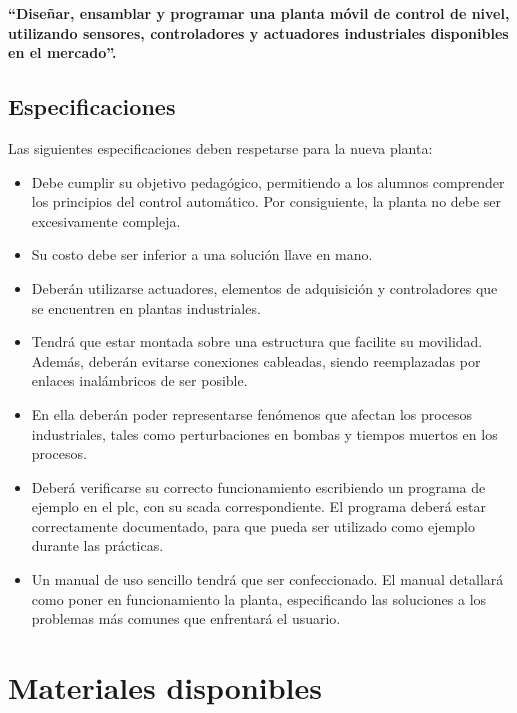 \textbf{``Diseñar, ensamblar y programar una planta móvil de control de nivel,
utilizando sensores, controladores y actuadores industriales disponibles en el
mercado''.}

\subsection{Especificaciones}
\label{subsec:especificaciones}

Las siguientes especificaciones deben respetarse para la nueva planta:

\begin{itemize}
\item Debe cumplir su objetivo pedagógico, permitiendo
 a los alumnos comprender los principios del control automático.
 Por consiguiente, la planta no debe ser excesivamente compleja.
 \item Su costo debe ser inferior a una solución llave en mano.
 \item Deberán utilizarse actuadores, elementos de adquisición
 y controladores que se encuentren en plantas industriales.
 \item Tendrá que estar montada sobre una estructura que facilite su
movilidad. Además, deberán evitarse conexiones cableadas, siendo reemplazadas
por enlaces inalámbricos de ser posible.
 \item En ella deberán poder representarse fenómenos que
afectan los procesos industriales, tales como perturbaciones en bombas y
tiempos muertos en los procesos.
 \item Deberá verificarse su correcto funcionamiento escribiendo un programa de
ejemplo en el \gls{plc}, con su \gls{scada} correspondiente.
El programa deberá estar correctamente documentado, para que pueda ser
utilizado como ejemplo durante las prácticas.
 \item Un manual de uso sencillo tendrá que ser confeccionado.
 El manual detallará como poner en funcionamiento la planta, especificando las
soluciones a los problemas más comunes que enfrentará el usuario.
\end{itemize}

\section{Materiales disponibles}
\label{sec:MaterialesDisponibles}

